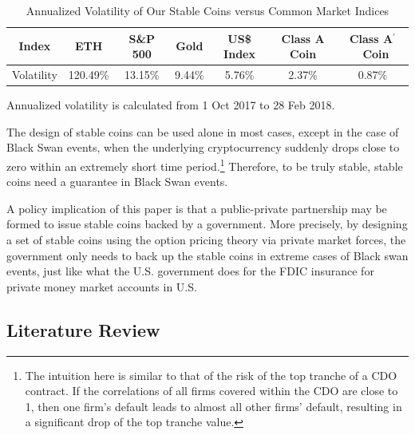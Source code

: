 \documentclass[11pt]{article}%
\numberwithin{equation}{section}
\theoremstyle{plain}
\newcommand{\Ap}{A\ensuremath{^\prime}~}
\begin{document}
\begin{table}[!htb]
	\footnotesize
	\centering
	\caption{Annualized Volatility of Our Stable Coins versus Common Market Indices}\label{tbl:volcomp}
	\begin{tabular}{@{}c c c c c c c}
	\toprule
	Index & ETH & S\&P 500 & Gold &  US\$ Index & Class A Coin & Class \Ap Coin \\\midrule
	Volatility & 120.49\% & 13.15\% & 9.44\%  & 5.76\% & 2.37\% & 0.87\%\\
	\bottomrule
	\end{tabular}
	\vspace{0.5em}
	\par\flushleft\footnotesize Annualized volatility is calculated from 1 Oct 2017 to 28 Feb 2018.
\end{table}


The design of stable coins can be used alone in most cases, except in the case of Black Swan events, when the underlying cryptocurrency suddenly drops close to zero within an extremely short time period.\footnote{The intuition here is similar to that of the risk of the top tranche of a CDO contract. If the correlations of all firms covered within the CDO are close to 1, then one firm's default leads to almost all other firms' default, resulting in a significant drop of the top tranche value.} Therefore, to be truly stable, stable coins need a guarantee in Black Swan events.




A policy implication of this paper is that a public-private partnership may be formed to issue stable coins backed by a government. More precisely, by designing a set of stable coins using the option pricing theory via private market forces, the government only needs to back up the stable coins in extreme cases of Black swan events, just like what the U.S. government does for the FDIC insurance for private money market accounts in U.S.




\subsection{Literature Review}
\end{document}
